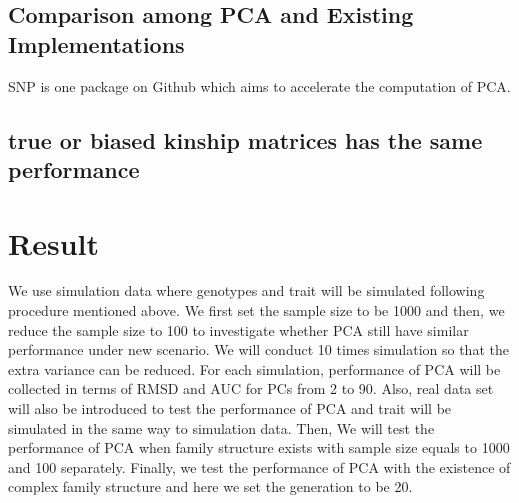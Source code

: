 \documentclass[12pt]{article}
\begin{document}
\subsection{Comparison among PCA and Existing Implementations }
SNP is one package on Github which aims to accelerate the computation of PCA.

\subsection{true or biased kinship matrices has the same performance}



\section{Result}

We use simulation data where genotypes and trait will be simulated following procedure mentioned above. We first set the sample size to be 1000 and then, we reduce the sample size to 100 to investigate whether PCA still have similar performance under new scenario. We will conduct 10 times simulation so that the extra variance can be reduced. For each simulation, performance of PCA will be collected in terms of RMSD and AUC for PCs from 2 to 90. Also, real data set will also be introduced to test the performance of PCA and trait will be simulated in the same way to simulation data. Then, We will test the performance of PCA when family structure exists with sample size equals to 1000 and 100 separately. Finally, we test the performance of PCA with the existence of complex family structure and here we set the generation to be 20.
\end{document}
